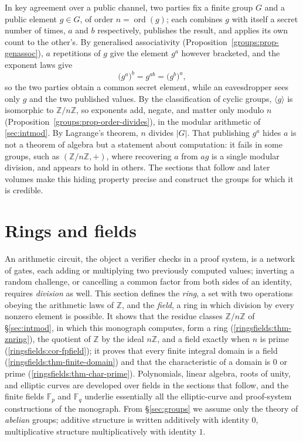 \documentclass[11pt,a4paper]{article}
\theoremstyle{definition}
\theoremstyle{remark}
\newcommand{\Z}{\ensuremath{\mathbb{Z}}}
\newcommand{\Fp}{\ensuremath{\mathbb{F}_{p}}}
\newcommand{\Fq}{\ensuremath{\mathbb{F}_{q}}}
\DeclareMathOperator{\ord}{ord}
\providecommand{\abs}[1]{\lvert #1 \rvert}
\begin{document}
In key agreement over a public channel, two parties fix a finite group
\(G\) and a public element \(g \in G\), of order \(n = \ord(g)\); each
combines \(g\) with itself a secret number of times, \(a\) and \(b\)
respectively, publishes the result, and applies its own count to the
other's. By generalised associativity
(Proposition~\ref{groups:prop-genassoc}), \(a\) repetitions of \(g\) give
the element \(g^a\) however bracketed, and the exponent laws give
\[
\bigl(g^a\bigr)^b = g^{ab} = \bigl(g^b\bigr)^a ,
\]
so the two parties obtain a common secret element, while an eavesdropper
sees only \(g\) and the two published values. By the classification of cyclic
groups, \(\langle g\rangle\) is isomorphic to \(\Z/n\Z\), so exponents add,
negate, and matter only modulo \(n\)
(Proposition~\ref{groups:prop-order-divides}), in the modular arithmetic of
\cref{sec:intmod}. By Lagrange's theorem, \(n\) divides \(\abs{G}\).
That publishing \(g^a\) hides \(a\) is not a theorem of algebra but a
statement about computation: it fails in some groups, such as
\((\Z/n\Z,+)\), where recovering \(a\) from \(ag\) is a single modular
division, and appears to hold in others. The sections that follow and later
volumes make this hiding property precise and construct the groups for which
it is credible.

\section{Rings and fields}\label{sec:ringsfields}

An arithmetic circuit, the object a verifier checks in a proof system, is a
network of gates, each adding or multiplying two previously computed
values; inverting a random challenge, or cancelling a common factor from
both sides of an identity, requires \emph{division} as well. This section
defines the \emph{ring}, a set with two operations obeying the arithmetic
laws of \(\Z\), and the \emph{field}, a ring in which division by every
nonzero element is possible. It shows that the residue classes \(\Z/n\Z\) of
\S\ref{sec:intmod}, in which this monograph computes, form a ring
(\cref{ringsfields:thm-znring}), the quotient of \(\Z\) by the ideal
\(n\Z\), and a field exactly when \(n\) is prime
(\cref{ringsfields:cor-fpfield}); it proves that every finite integral
domain is a field (\cref{ringsfields:thm-finite-domain}) and that the
characteristic of a domain is \(0\) or prime
(\cref{ringsfields:thm-char-prime}). Polynomials, linear algebra, roots of
unity, and elliptic curves are developed over fields in the sections that
follow, and the finite fields \(\Fp\) and \(\Fq\) underlie essentially all
the elliptic-curve and proof-system constructions of the monograph. From
\S\ref{sec:groups} we assume only the theory of \emph{abelian} groups;
additive structure is written additively with identity \(0\),
multiplicative structure multiplicatively with identity \(1\).
\end{document}
